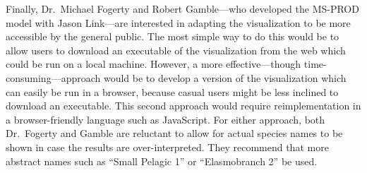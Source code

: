 Finally, Dr.\ Michael Fogerty and Robert Gamble---who developed the MS-PROD model with Jason Link---are interested in adapting the visualization to be more accessible by the general public.  The most simple way to do this would be to allow users to download an executable of the visualization from the web which could be run on a local machine.  However, a more effective---though time-consuming---approach would be to develop a version of the visualization which can easily be run in a browser, because casual users might be less inclined to download an executable.  This second approach would require reimplementation in a browser-friendly language such as JavaScript.  For either approach, both Dr.\ Fogerty and Gamble are reluctant to allow for actual species names to be shown in case the results are over-interpreted.  They recommend that more abstract names such as ``Small Pelagic 1''  or ``Elasmobranch 2'' be used.
